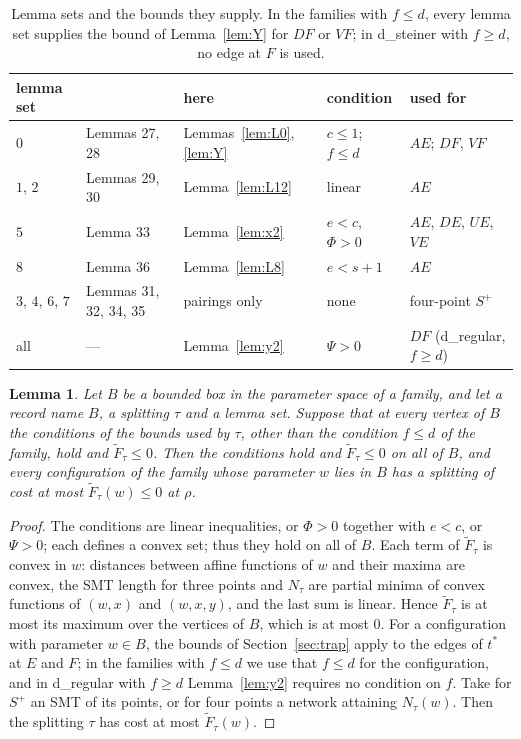 \documentclass[11pt]{amsart}
\newtheorem{lemma}[theorem]{Lemma}
\theoremstyle{definition}
\theoremstyle{remark}
\numberwithin{equation}{section}
\begin{document}
\begin{table}[ht]
\centering
\small
\begin{tabular}{@{}lllll@{}}
\toprule
lemma set & \cite{KHSHGW} & here & condition & used for\\
\midrule
$0$ & Lemmas 27, 28 & Lemmas~\ref{lem:L0}, \ref{lem:Y} & $c\le1$; $f\le d$ & $AE$; $DF$, $VF$\\
$1$, $2$ & Lemmas 29, 30 & Lemma~\ref{lem:L12} & linear & $AE$\\
$5$ & Lemma 33 & Lemma~\ref{lem:x2} & $e<c$, $\Phi>0$ & $AE$, $DE$, $UE$, $VE$\\
$8$ & Lemma 36 & Lemma~\ref{lem:L8} & $e<s+1$ & $AE$\\
$3$, $4$, $6$, $7$ & Lemmas 31, 32, 34, 35 & pairings only & none & four-point $S^+$\\
all & --- & Lemma~\ref{lem:y2} & $\Psi>0$ & $DF$ (d\_regular, $f\ge d$)\\
\bottomrule
\end{tabular}
\caption{Lemma sets and the bounds they supply. In the families with $f\le d$, every lemma set supplies the bound of Lemma~\ref{lem:Y} for $DF$ or $VF$; in d\_steiner with $f\ge d$, no edge at $F$ is used.}\label{tab:lemmas}
\end{table}

\begin{lemma}\label{lem:vertex}
Let $B$ be a bounded box in the parameter space of a family, and let a record name $B$, a splitting $\tau$ and a lemma set. Suppose that at every vertex of $B$ the conditions of the bounds used by $\tau$, other than the condition $f\le d$ of the family, hold and $\tilde F_\tau\le0$. Then the conditions hold and $\tilde F_\tau\le0$ on all of $B$, and every configuration of the family whose parameter $w$ lies in $B$ has a splitting of cost at most $\tilde F_\tau(w)\le0$ at $\rho$.
\end{lemma}

\begin{proof}
The conditions are linear inequalities, or $\Phi>0$ together with $e<c$, or $\Psi>0$; each defines a convex set; thus they hold on all of $B$. Each term of $\tilde F_\tau$ is convex in $w$: distances between affine functions of $w$ and their maxima are convex, the SMT length for three points and $N_\tau$ are partial minima of convex functions of $(w,x)$ and $(w,x,y)$, and the last sum is linear. Hence $\tilde F_\tau$ is at most its maximum over the vertices of $B$, which is at most $0$. For a configuration with parameter $w\in B$, the bounds of Section~\ref{sec:trap} apply to the edges of $t^*$ at $E$ and $F$; in the families with $f\le d$ we use that $f\le d$ for the configuration, and in d\_regular with $f\ge d$ Lemma~\ref{lem:y2} requires no condition on $f$. Take for $S^+$ an SMT of its points, or for four points a network attaining $N_\tau(w)$. Then the splitting $\tau$ has cost at most $\tilde F_\tau(w)$.
\end{proof}
\end{document}
